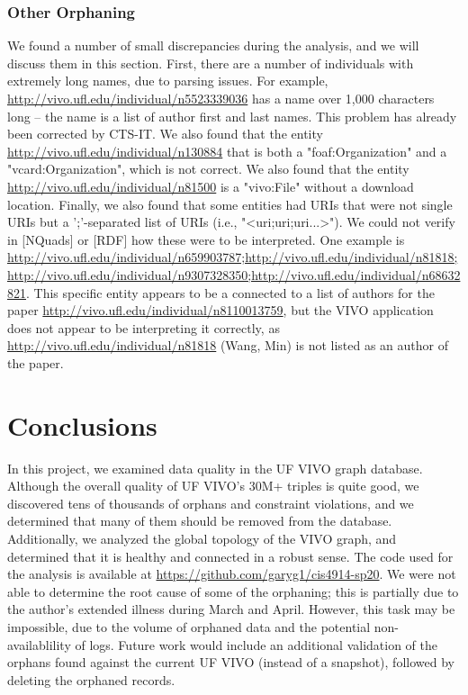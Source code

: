 \documentclass[11pt]{article}
\begin{document}
\subsubsection*{Other Orphaning}
We found a number of small discrepancies during the analysis, and we will discuss them in this section. First, there are a number of individuals with extremely long names, due to parsing issues. For example, \url{http://vivo.ufl.edu/individual/n5523339036} has a name over 1,000 characters long -- the name is a list of author first and last names. This problem has already been corrected by CTS-IT. We also found that the entity \url{http://vivo.ufl.edu/individual/n130884} that is both a "foaf:Organization" and a "vcard:Organization", which is not correct. We also found that the entity \url{http://vivo.ufl.edu/individual/n81500} is a "vivo:File" without a download location. Finally, we also found that some entities had URIs that were not single URIs but a ';'-separated list of URIs (i.e., "<uri;uri;uri...>"). We could not verify in [NQuads] or [RDF] how these were to be interpreted. One example is \url{http://vivo.ufl.edu/individual/n659903787;http://vivo.ufl.edu/individual/n81818;http://vivo.ufl.edu/individual/n9307328350;http://vivo.ufl.edu/individual/n68632821}. This specific entity appears to be a connected to a list of authors for the paper \url{http://vivo.ufl.edu/individual/n8110013759}, but the VIVO application does not appear to be interpreting it correctly, as \url{http://vivo.ufl.edu/individual/n81818} (Wang, Min) is not listed as an author of the paper.

\section*{Conclusions}
In this project, we examined data quality in the UF VIVO graph database. Although the overall quality of UF VIVO's 30M+ triples is quite good, we discovered tens of thousands of orphans and constraint violations, and we determined that many of them should be removed from the database. Additionally, we analyzed the global topology of the VIVO graph, and determined that it is healthy and connected in a robust sense. The code used for the analysis is available at \url{https://github.com/garyg1/cis4914-sp20}. We were not able to determine the root cause of some of the orphaning; this is partially due to the author's extended illness during March and April. However, this task may be impossible, due to the volume of orphaned data and the potential non-availablility of logs. Future work would include an additional validation of the orphans found against the current UF VIVO (instead of a snapshot), followed by deleting the orphaned records.
\end{document}
